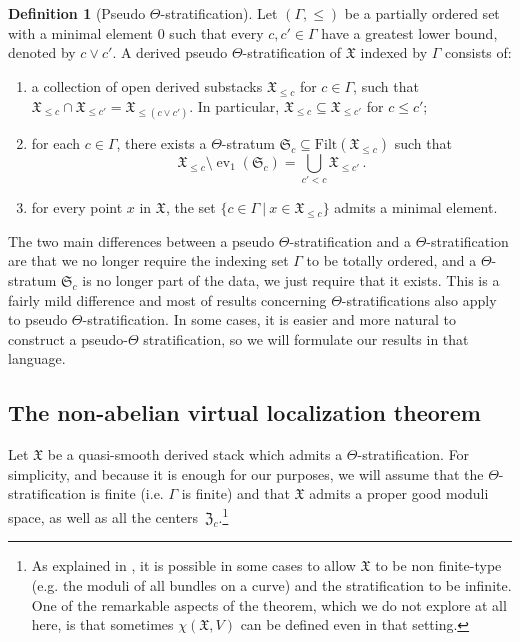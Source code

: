 \documentclass[12pt]{amsart}
\theoremstyle{definition}
\newtheorem{definition}{Definition}[section]
\newcommand{\1}{\mathbf 1}
\newcommand{\FX}{{\mathfrak{X}}}
\newcommand{\FZ}{{\mathfrak{Z}}}
\newcommand{\FS}{{\mathfrak{S}}}
\newcommand{\Filt}{\mathrm{Filt}}
\begin{document}
\begin{definition}[Pseudo $\Theta$-stratification]
 Let $(\Gamma, \leq)$ be a partially ordered set with a minimal element $0$ such that every $c, c'\in \Gamma$ have a greatest lower bound, denoted by $c\vee c'$. A derived pseudo $\Theta$-stratification of $\FX$ indexed by $\Gamma$ consists of:
\begin{enumerate}
    \item a collection of open derived substacks $\FX_{\leq c}$ for $c \in \Gamma$, such that $\FX_{\leq c}\cap \FX_{\leq c'}=\FX_{\leq (c\vee c')}$. In particular, $\mathfrak X_{\leq c} \subseteq \FX_{\leq c'}$ for $c \leq  c'$;
\item  for each $c\in \Gamma$, there exists a $\Theta$-stratum $\FS_c\subseteq \Filt(\mathfrak \FX_{\leq c})$ such that 
\[\mathfrak X_{\leq c} \setminus \operatorname{ev}_1(\mathfrak S_c) = \bigcup \limits_{c'<c} \mathfrak X_{\leq c'}\,.\]
\item for every point $x$ in $\mathfrak X$, the set $\{c \in \Gamma \ | \ x \in \FX_{\leq c}\}$ admits a minimal element.
\end{enumerate} 
\end{definition}

The two main differences between a pseudo $\Theta$-stratification and a $\Theta$-stratification are that we no longer require the indexing set $\Gamma$ to be totally ordered, and a $\Theta$-stratum $\FS_c$ is no longer part of the data, we just require that it exists. This is a fairly mild difference and most of results concerning $\Theta$-stratifications also apply to pseudo $\Theta$-stratification. In some cases, it is easier and more natural to construct a pseudo-$\Theta$ stratification, so we will formulate our results in that language.


\subsection{The non-abelian virtual localization theorem}
\label{subsec: NAloc}

Let $\FX$ be a quasi-smooth derived stack which admits a $\Theta$-stratification. For simplicity, and because it is enough for our purposes, we will assume that the $\Theta$-stratification is finite (i.e. $\Gamma$ is finite) and that $\FX$ admits a proper good moduli space, as well as all the centers~$\FZ_c$.\footnote{As explained in \cite{HLNAL}, it is possible in some cases to allow $\FX$ to be non finite-type (e.g. the moduli of all bundles on a curve) and the stratification to be infinite. One of the remarkable aspects of the theorem, which we do not explore at all here, is that sometimes $\chi(\FX, V)$ can be defined even in that setting.}
\end{document}
